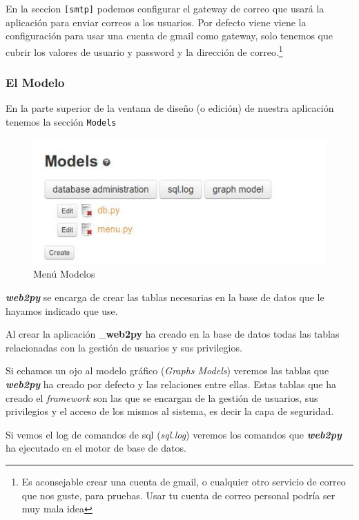 \documentclass[
  12pt,
  spanish,
]{article}
\begin{document}
En la seccion \texttt{{[}smtp{]}} podemos configurar el gateway de
correo que usará la aplicación para enviar correos a los usuarios. Por
defecto viene viene la configuración para usar una cuenta de gmail como
gateway, solo tenemos que cubrir los valores de usuario y password y la
dirección de correo.\footnote{Es aconsejable crear una cuenta de gmail,
  o cualquier otro servicio de correo que nos guste, para pruebas. Usar
  tu cuenta de correo personal podría ser muy mala idea}

\hypertarget{el-modelo}{%
\subsubsection{El Modelo}\label{el-modelo}}

En la parte superior de la ventana de diseño (o edición) de nuestra
aplicación tenemos la sección \texttt{Models}

\begin{figure}
\centering
\includegraphics{src/img/models_menu.jpg}
\caption{Menú Modelos}
\end{figure}

\textbf{\emph{web2py}} se encarga de crear las tablas necesarias en la
base de datos que le hayamos indicado que use.

Al crear la aplicación \_\textbf{web2py} ha creado en la base de datos
todas las tablas relacionadas con la gestión de usuarios y sus
privilegios.

Si echamos un ojo al modelo gráfico (\emph{Graphs Models}) veremos las
tablas que \textbf{\emph{web2py}} ha creado por defecto y las relaciones
entre ellas. Estas tablas que ha creado el \emph{framework} son las que
se encargan de la gestión de usuarios, sus privilegios y el acceso de
los mismos al sistema, es decir la capa de seguridad.

Si vemos el log de comandos de sql (\emph{sql.log}) veremos los comandos
que \textbf{\emph{web2py}} ha ejecutado en el motor de base de datos.
\end{document}
